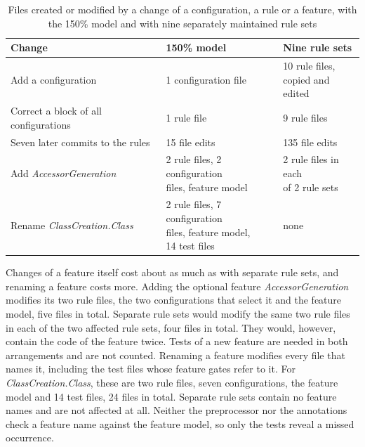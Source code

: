 \begin{table}[htbp]
    \centering
    \begin{tabular}{|l|l|l|}
        \hline
        \textbf{Change}                       & \textbf{150\% model}                       & \textbf{Nine rule sets}     \\
        \hline
        Add a configuration                   & 1 configuration file                       & \makecell[l]{10 rule files, \\ copied and edited} \\
        \hline
        Correct a block of all configurations & 1 rule file                                & 9 rule files                \\
        \hline
        Seven later commits to the rules      & 15 file edits                              & 135 file edits              \\
        \hline
        Add \textit{AccessorGeneration}       & \makecell[l]{2 rule files, 2 configuration                               \\ files, feature model} & \makecell[l]{2 rule files in each \\ of 2 rule sets} \\
        \hline
        Rename \textit{ClassCreation.Class}   & \makecell[l]{2 rule files, 7 configuration                               \\ files, feature model, \\ 14 test files} & none \\
        \hline
    \end{tabular}
    \caption{Files created or modified by a change of a configuration, a rule or a feature, with the 150\% model and with nine separately maintained rule sets}
    \label{table:adaptation-effort}
\end{table}

Changes of a feature itself cost about as much as with separate rule sets, and renaming a feature costs more.
Adding the optional feature \textit{AccessorGeneration} modifies its two rule files, the two configurations that select it and the feature model, five files in total.
Separate rule sets would modify the same two rule files in each of the two affected rule sets, four files in total.
They would, however, contain the code of the feature twice.
Tests of a new feature are needed in both arrangements and are not counted.
Renaming a feature modifies every file that names it, including the test files whose feature gates refer to it.
For \textit{ClassCreation.Class}, these are two rule files, seven configurations, the feature model and 14 test files, 24 files in total.
Separate rule sets contain no feature names and are not affected at all.
Neither the preprocessor nor the annotations check a feature name against the feature model, so only the tests reveal a missed occurrence.

